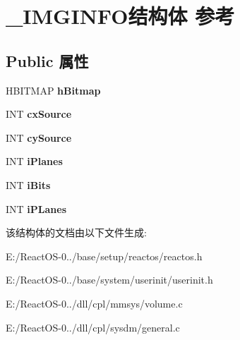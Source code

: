 \hypertarget{struct___i_m_g_i_n_f_o}{}\section{\+\_\+\+I\+M\+G\+I\+N\+F\+O结构体 参考}
\label{struct___i_m_g_i_n_f_o}
\subsection*{Public 属性}
\begin{DoxyCompactItemize}
\item 
\mbox{\label{struct___i_m_g_i_n_f_o_ad9a09be9b85ea317ab22b98f61b0ae7f}} 
H\+B\+I\+T\+M\+AP {\bfseries h\+Bitmap}
\item 
\mbox{\label{struct___i_m_g_i_n_f_o_a24a908ad2e039030215fb8cc4cb0871f}} 
I\+NT {\bfseries cx\+Source}
\item 
\mbox{\label{struct___i_m_g_i_n_f_o_ad580bc2780ac051c9e5fee92ff122800}} 
I\+NT {\bfseries cy\+Source}
\item 
\mbox{\label{struct___i_m_g_i_n_f_o_a095f9f68c504a7c5d120deb5c74a0b77}} 
I\+NT {\bfseries i\+Planes}
\item 
\mbox{\label{struct___i_m_g_i_n_f_o_aac25ef7e9371223a5ee9d17e3f9e0c0b}} 
I\+NT {\bfseries i\+Bits}
\item 
\mbox{\label{struct___i_m_g_i_n_f_o_a40f1d248441cacde68da3df98d981261}} 
I\+NT {\bfseries i\+P\+Lanes}
\end{DoxyCompactItemize}


该结构体的文档由以下文件生成\+:\begin{DoxyCompactItemize}
\item 
E\+:/\+React\+O\+S-\/0../base/setup/reactos/reactos.\+h\item 
E\+:/\+React\+O\+S-\/0../base/system/userinit/userinit.\+h\item 
E\+:/\+React\+O\+S-\/0../dll/cpl/mmsys/volume.\+c\item 
E\+:/\+React\+O\+S-\/0../dll/cpl/sysdm/general.\+c\end{DoxyCompactItemize}
